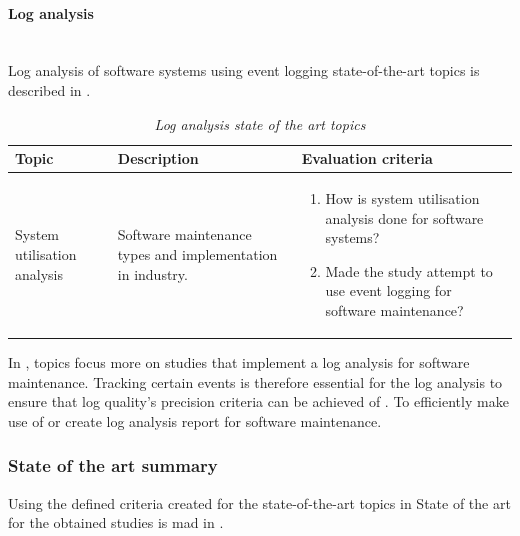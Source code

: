 \clearpage

\paragraph{Log analysis} \leavevmode\\
Log analysis of software systems using event logging state-of-the-art topics is described in .

\begin{table}[!htb]
	\centering
	\caption[Log analysis state of the art topics]
	{\textit{Log analysis state of the art topics}}
	\label{tbl:ch1_soaLogAnalysis}
	\begin{tabularx}{\linewidth}{|l|X|X|}
		\hline \textbf{Topic}  & \textbf{Description} & \textbf{Evaluation criteria}\\
		\hline System utilisation analysis & \RaggedRight Software maintenance types and implementation in industry. & \RaggedRight \begin{enumerate}
			\item How is system utilisation analysis done for software systems?
			\item Made the study attempt to use event logging for software maintenance?
		\end{enumerate} \\
		\hline
	\end{tabularx}
\end{table}

In , topics focus more on studies that implement a log analysis for software maintenance. Tracking certain events is therefore essential for the log analysis to ensure that log quality's precision criteria can be achieved of . To efficiently make use of or create log analysis report for software maintenance.

\subsubsection{State of the art summary}
Using the defined criteria created for the state-of-the-art topics in  State of the art for the obtained studies is mad in .


